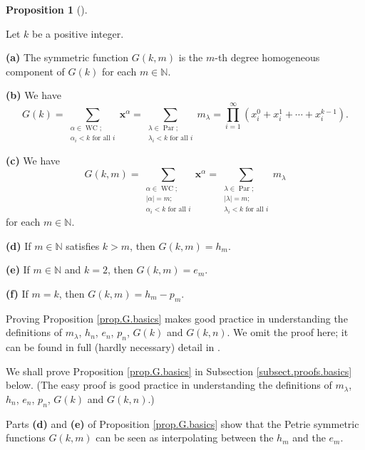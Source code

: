 \documentclass[numbers=enddot,12pt,final,onecolumn,notitlepage]{scrartcl}%
\theoremstyle{definition}
\newtheorem{prop}[theo]{Proposition}
\newenvironment{proposition}[1][]
{\begin{prop}[#1]\begin{leftbar}}
{\end{leftbar}\end{prop}}
\let\sumnonlimits\sum
\let\prodnonlimits\prod
\renewcommand{\sum}{\sumnonlimits\limits}
\renewcommand{\prod}{\prodnonlimits\limits}
\newenvironment{verlong}{}{}
\newenvironment{vershort}{}{}
\begin{document}
\begin{proposition}
\label{prop.G.basics}Let $k$ be a positive integer.

\textbf{(a)} The symmetric function $G\left(  k,m\right)  $ is the $m$-th
degree homogeneous component of $G\left(  k\right)  $ for each $m\in
\mathbb{N}$.

\textbf{(b)} We have%
\[
G\left(  k\right)  =\sum_{\substack{\alpha\in\operatorname*{WC};\\\alpha
_{i}<k\text{ for all }i}}\mathbf{x}^{\alpha}=\sum_{\substack{\lambda
\in\operatorname*{Par};\\\lambda_{i}<k\text{ for all }i}}m_{\lambda}%
=\prod_{i=1}^{\infty}\left(  x_{i}^{0}+x_{i}^{1}+\cdots+x_{i}^{k-1}\right)  .
\]


\textbf{(c)} We have
\[
G\left(  k,m\right)  =\sum_{\substack{\alpha\in\operatorname*{WC};\\\left\vert
\alpha\right\vert =m;\\\alpha_{i}<k\text{ for all }i}}\mathbf{x}^{\alpha}%
=\sum_{\substack{\lambda\in\operatorname*{Par};\\\left\vert \lambda\right\vert
=m;\\\lambda_{i}<k\text{ for all }i}}m_{\lambda}%
\]
for each $m\in\mathbb{N}$.

\textbf{(d)} If $m\in\mathbb{N}$ satisfies $k>m$, then $G\left(  k,m\right)
=h_{m}$.

\textbf{(e)} If $m\in\mathbb{N}$ and $k=2$, then $G\left(  k,m\right)  =e_{m}$.

\textbf{(f)} If $m=k$, then $G\left(  k,m\right)  =h_{m}-p_{m}$.
\end{proposition}

\begin{vershort}
Proving Proposition \ref{prop.G.basics} makes good practice in understanding
the definitions of $m_{\lambda}$, $h_{n}$, $e_{n}$, $p_{n}$, $G\left(
k\right)  $ and $G\left(  k,n\right)  $. We omit the proof here; it can be
found in full (hardly necessary) detail in \cite{verlong}.
\end{vershort}

\begin{verlong}
We shall prove Proposition \ref{prop.G.basics} in Subsection
\ref{subsect.proofs.basics} below. (The easy proof is good practice in
understanding the definitions of $m_{\lambda}$, $h_{n}$, $e_{n}$, $p_{n}$,
$G\left(  k\right)  $ and $G\left(  k,n\right)  $.)
\end{verlong}

Parts \textbf{(d)} and \textbf{(e)} of Proposition \ref{prop.G.basics} show
that the Petrie symmetric functions $G\left(  k,m\right)  $ can be seen as
interpolating between the $h_{m}$ and the $e_{m}$.
\end{document}
